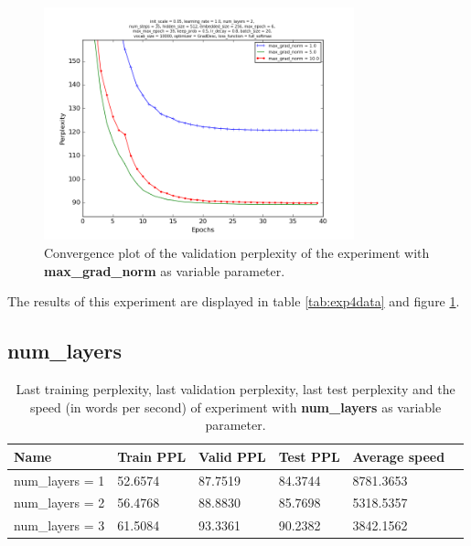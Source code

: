 \documentclass[10pt,a4paper,titlepage]{article}
\begin{document}
\begin{figure}[H]
	\begin{center}
		\includegraphics[width=0.80\textwidth]{Figures/maxgradperf.png}
		\caption{Convergence plot of the validation perplexity of the experiment with \textbf{max\_grad\_norm} as variable parameter. }
		\label{fig:exp4perf}
	\end{center}	
\end{figure}

The results of this experiment are displayed in table \ref{tab:exp4data} and figure \ref{fig:exp4perf}.

\newpage

\subsection{num\_layers}

\begin{table}[H]
\centering
\caption{Last training perplexity, last validation perplexity, last test perplexity and the speed (in words per second) of experiment with \textbf{num\_layers} as variable parameter.}
\label{tab:exp5data}
\begin{tabular}{|l|l|l|l|l|l|}
\hline
{\small Name} & {\small Train PPL} & {\small Valid PPL} & {\small Test PPL} & {\small Average speed}\\ \hline
{\small num\_layers = 1 }                               & 52.6574    & 87.7519    & 84.3744    & 8781.3653  \\ \hline
{\small num\_layers = 2}                                & 56.4768    & 88.8830    & 85.7698    & 5318.5357  \\ \hline
{\small num\_layers = 3}                                & 61.5084    & 93.3361    & 90.2382    & 3842.1562  \\ \hline
\end{tabular}
\end{table}
\end{document}
